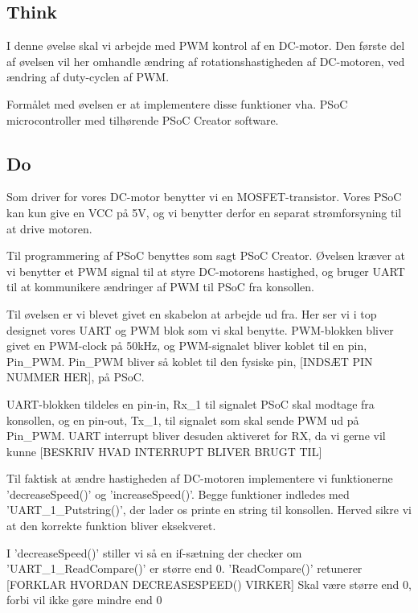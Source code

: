 \documentclass[../main.tex]{subfiles}
\begin{document}
\subsection{Think}
I denne øvelse skal vi arbejde med PWM kontrol af en DC-motor. Den første del af øvelsen vil her omhandle ændring af rotationshastigheden af DC-motoren, ved ændring af duty-cyclen af PWM.

Formålet med øvelsen er at implementere disse funktioner vha. PSoC microcontroller med tilhørende PSoC Creator software. 

\subsection{Do}
Som driver for vores DC-motor benytter vi en MOSFET-transistor. Vores PSoC kan kun give en VCC på 5V, og vi benytter derfor en separat strømforsyning til at drive motoren.

Til programmering af PSoC benyttes som sagt PSoC Creator. Øvelsen kræver at vi benytter et PWM signal til at styre DC-motorens hastighed, og bruger UART til at kommunikere ændringer af PWM til PSoC fra konsollen.

Til øvelsen er vi blevet givet en skabelon at arbejde ud fra. Her ser vi i top designet vores UART og PWM blok som vi skal benytte. PWM-blokken bliver givet en PWM-clock på 50kHz, og PWM-signalet bliver koblet til en pin, Pin\_PWM. Pin\_PWM bliver så koblet til den fysiske pin, [INDSÆT PIN NUMMER HER], på PSoC.


UART-blokken tildeles en pin-in, Rx\_1 til signalet PSoC skal modtage fra konsollen, og en pin-out, Tx\_1, til signalet som skal sende PWM ud på Pin\_PWM. UART interrupt bliver desuden aktiveret for RX, da vi gerne vil kunne [BESKRIV HVAD INTERRUPT BLIVER BRUGT TIL]

Til faktisk at ændre hastigheden af DC-motoren implementere vi funktionerne ’decreaseSpeed()’ og ’increaseSpeed()’. Begge funktioner indledes med ’UART\_1\_Putstring()’, der lader os printe en string til konsollen. Herved sikre vi at den korrekte funktion bliver eksekveret. 


I ’decreaseSpeed()’ stiller vi så en if-sætning der checker om ’UART\_1\_ReadCompare()’ er større end 0. ’ReadCompare()’ retunerer [FORKLAR HVORDAN DECREASESPEED() VIRKER]
Skal være større end 0, forbi vil ikke gøre mindre end 0
\end{document}
